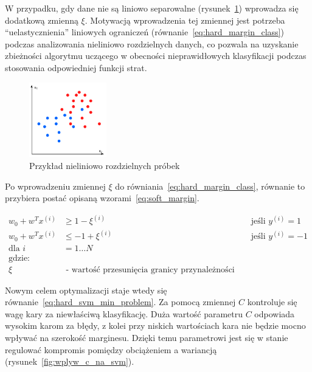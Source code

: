 \bigskip

W przypadku, gdy dane nie są liniowo separowalne (rysunek~\ref{fig:sofm_margin}) wprowadza się dodatkową zmienną $\xi$.
Motywacją wprowadzenia tej zmiennej jest potrzeba ``uelastycznienia'' liniowych
ograniczeń (równanie~\ref{eq:hard_margin_class}) podczas analizowania nieliniowo rozdzielnych danych,
co pozwala na uzyskanie zbieżności algorytmu uczącego w obecności nieprawidłowych klasyfikacji
podczas stosowania odpowiedniej funkcji strat.

\begin{figure}[]
    \centering
    \includegraphics[width=0.3\textwidth]{images/soft-margin.drawio}
    \caption{ Przykład nieliniowo rozdzielnych próbek}
    \customsource
    \label{fig:sofm_margin}
\end{figure}

Po wprowadzeniu zmiennej $\xi$ do równiania~\ref{eq:hard_margin_class},
równanie to przybiera postać opisaną wzorami~\ref{eq:soft_margin}.

\begin{equation}
    \begin{aligned}
        w_0 +w^{T}x^{(i)} &\geq 1 - \xi^{(i)} && \text{ jeśli } y^{(i)} =1
        \\
        w_0 +w^{T}x^{(i)} &\leq -1 + \xi^{(i)} && \text{ jeśli } y^{(i)} =-1
        \\
        \text{dla } i&= 1\dots N \\
        \text{gdzie:} \\
        \xi & \text{ - wartość przesunięcia granicy przynależności}
    \end{aligned}
    \label{eq:soft_margin}
\end{equation}

Nowym celem optymalizacji staje wtedy się równanie~\ref{eq:hard_svm_min_problem}.
Za pomocą zmiennej $C$ kontroluje się wagę kary za niewłaściwą klasyfikację.
Duża wartość parametru $C$ odpowiada wysokim karom za błędy, z kolei przy niskich wartościach
kara nie będzie mocno wpływać na szerokość marginesu.
Dzięki temu parametrowi jest się w stanie regulować kompromis pomiędzy
obciążeniem a wariancją~\cite{raschka2017python} (rysunek~\ref{fig:wplyw_c_na_svm}).


